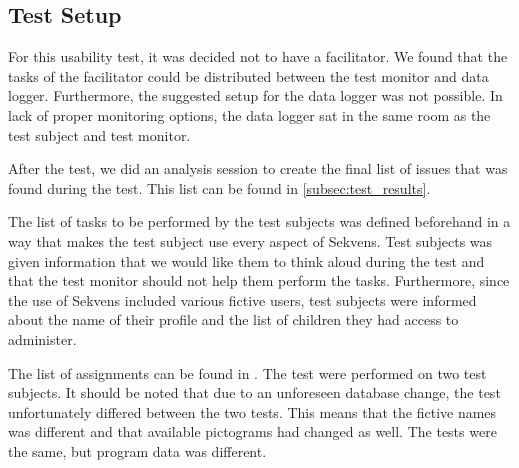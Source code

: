 \subsection{Test Setup}\label{subsec:test_setup}

For this usability test, it was decided not to have a facilitator. We found that the tasks of the facilitator could be distributed between the test monitor and data logger. Furthermore, the suggested setup for the data logger was not possible. In lack of proper monitoring options, the data logger sat in the same room as the test subject and test monitor.

After the test, we did an analysis session to create the final list of issues that was found during the test. This list can be found in \ref{subsec:test_results}.

The list of tasks to be performed by the test subjects was defined beforehand in a way that makes the test subject use every aspect of Sekvens.
Test subjects was given information that we would like them to think aloud during the test and that the test monitor should not help them perform the tasks.
Furthermore, since the use of Sekvens included various fictive users, test subjects were informed about the name of their profile and the list of children they had access to administer.

The list of assignments can be found in .
The test were performed on two test subjects. It should be noted that due to an unforeseen database change, the test unfortunately differed between the two tests. This means that the fictive names was different and that available pictograms had changed as well. The tests were the same, but program data was different.